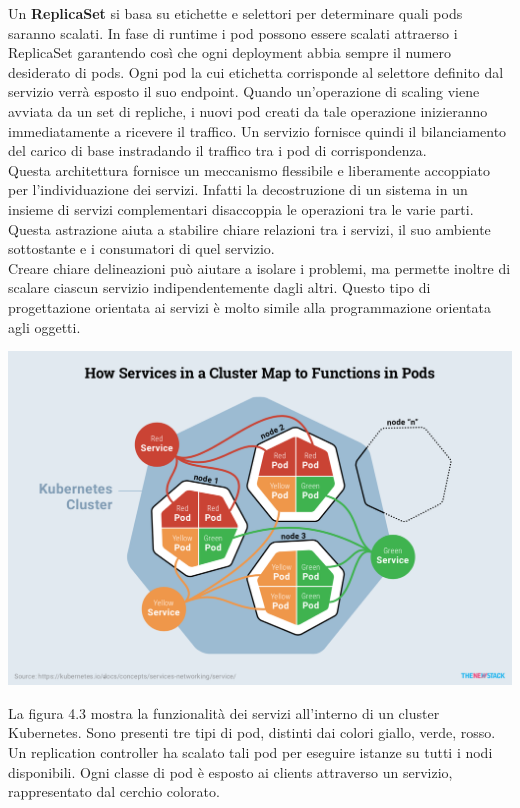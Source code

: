 \documentclass[12pt, a4paper]{report}
\begin{document}
Un \textbf{ReplicaSet} si basa su etichette e selettori per determinare quali pods saranno scalati. In fase di runtime i pod possono essere scalati attraerso i ReplicaSet garantendo così che ogni deployment abbia sempre il numero desiderato di pods. Ogni pod la cui etichetta corrisponde al selettore definito dal servizio verrà esposto il suo endpoint. Quando un'operazione di scaling viene avviata da un set di repliche, i nuovi pod creati da tale operazione inizieranno immediatamente a ricevere il traffico. Un servizio fornisce quindi il bilanciamento del carico di base instradando il traffico tra i pod di corrispondenza.
\\
Questa architettura fornisce un meccanismo flessibile e liberamente accoppiato per l'individuazione dei servizi. Infatti la decostruzione di un sistema in un insieme di servizi complementari disaccoppia le operazioni tra le varie parti. Questa astrazione aiuta a stabilire chiare relazioni tra i servizi, il suo ambiente sottostante e i consumatori di quel servizio.\\
Creare chiare delineazioni può aiutare a isolare i problemi, ma permette inoltre di scalare ciascun servizio indipendentemente dagli altri. Questo tipo di progettazione orientata ai servizi è molto simile alla programmazione orientata agli oggetti.
\begin{center}
  \includegraphics[scale=0.6]{Images/Kubernetes-service}
\end{center}
La figura 4.3 mostra la funzionalità dei servizi all'interno di un cluster Kubernetes. Sono presenti tre tipi di pod, distinti dai colori giallo, verde, rosso. Un replication controller ha scalato tali pod per eseguire istanze su tutti i nodi disponibili. Ogni classe di pod è esposto ai clients attraverso un servizio, rappresentato dal cerchio colorato.\\
\end{document}
